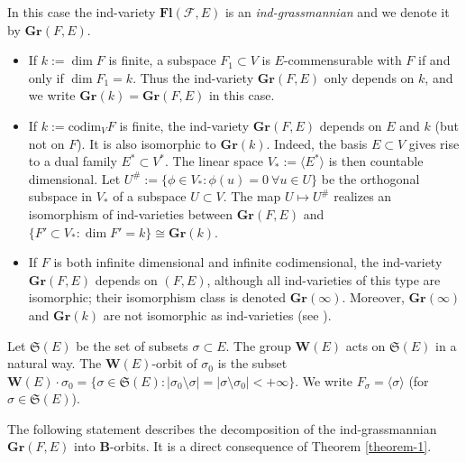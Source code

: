 \documentclass[12pt]{amsart}
\theoremstyle{definition}
\begin{document}
In this case the ind-variety $\mathbf{Fl}(\mathcal{F},E)$ is an {\em ind-grassmannian} and we denote it by $\mathbf{Gr}(F,E)$.
\begin{itemize}
\item
If $k:=\dim F$ is finite, a subspace $F_1\subset V$ is $E$-commensurable with $F$ if and only if $\dim F_1=k$.
Thus the ind-variety $\mathbf{Gr}(F,E)$ only depends on $k$, and we write $\mathbf{Gr}(k)=\mathbf{Gr}(F,E)$ in this case.
\item
If $k:=\mathrm{codim}_VF$ is finite, the ind-variety $\mathbf{Gr}(F,E)$ depends on $E$ and $k$ (but not on $F$). It is also isomorphic to $\mathbf{Gr}(k)$. Indeed, the basis $E\subset V$ gives rise to a dual family $E^*\subset V^*$. The linear space $V_*:=\langle E^*\rangle$ is then countable dimensional. Let $U^\#:=\{\phi\in V_*:\phi(u)=0\ \forall u\in U\}$ be the orthogonal subspace in $V_*$ of a subspace $U\subset V$. The map $U\mapsto U^\#$ realizes an isomorphism of ind-varieties between $\mathbf{Gr}(F,E)$ and $\{F'\subset V_*:\dim F'=k\}\cong\mathbf{Gr}(k)$.
\item
If $F$ is both infinite dimensional and infinite codimensional, the ind-variety $\mathbf{Gr}(F,E)$ depends on $(F,E)$, although all ind-varieties of this type are isomorphic; their isomorphism class is denoted $\mathbf{Gr}(\infty)$.
Moreover, $\mathbf{Gr}(\infty)$ and $\mathbf{Gr}(k)$ are not isomorphic as ind-varieties (see \cite{PT}).
\end{itemize}

Let $\mathfrak{S}(E)$ be the set of subsets $\sigma\subset E$. The  group $\mathbf{W}(E)$ acts on $\mathfrak{S}(E)$ in a natural way. The $\mathbf{W}(E)$-orbit of $\sigma_0$ is the subset $\mathbf{W}(E)\cdot\sigma_0=\{\sigma\in\mathfrak{S}(E):|\sigma_0\setminus\sigma|=|\sigma\setminus\sigma_0|<+\infty\}$.
We write $F_\sigma=\langle\sigma\rangle$ (for $\sigma\in\mathfrak{S}(E)$).

The following statement describes the decomposition of the ind-grassmannian $\mathbf{Gr}(F,E)$ into $\mathbf{B}$-orbits. It is a direct consequence of Theorem \ref{theorem-1}.
\end{document}
